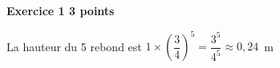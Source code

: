 \textbf{Exercice 1 \hfill 3 points}

\medskip

% 
% 
La hauteur du 5 rebond est $1 \times \left(\dfrac{3}{4}\right)^5 = \dfrac{3^5}{4^5} \approx 0,24$~m
\bigskip

